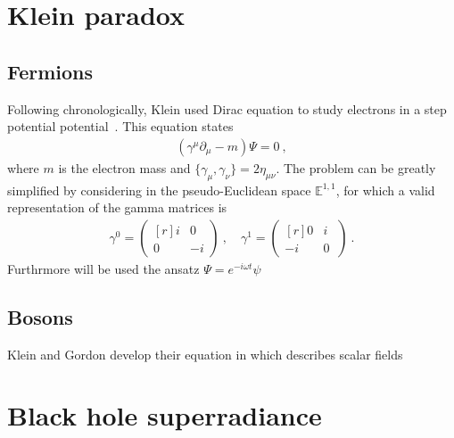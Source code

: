 
\section{Klein paradox} 

\subsection{Fermions}

Following chronologically, Klein used Dirac equation to study electrons in a step potential potential~\cite{Klein1929}.
This equation states
\begin{align}
    (\gamma^\mu \partial_\mu - m ) \Psi = 0 ~,
    \label{eq:dirac}
\end{align}
where $m$ is the electron mass and $\lbrace \gamma_\mu, \gamma_\nu \rbrace = 2 \eta_{\mu\nu}$.
The problem can be greatly simplified by considering in the pseudo-Euclidean space $\mathbb{E}^{1,1}$, for which a valid representation of the gamma matrices is
\begin{align}
    \gamma^0 = \begin{pmatrix*}[r] i & 0 \\ 0 & -i \end{pmatrix*} ~, \quad 
    \gamma^1 = \begin{pmatrix*}[r] 0 & i~ \\ -i & 0~ \end{pmatrix*} ~.
    \label{eq:gamma1+1}
\end{align}
Furthrmore will be used the ansatz $\Psi= e^{-i \omega t} \psi$

\subsection{Bosons}

Klein and Gordon develop their equation in which describes scalar fields



\section{Black hole superradiance}




\cleardoublepage
